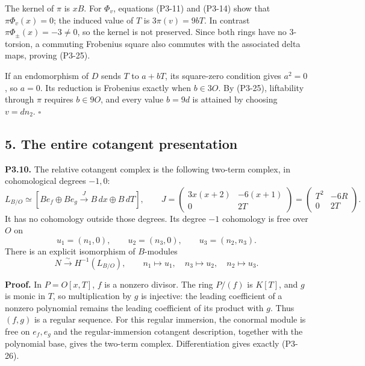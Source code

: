 \documentclass[
]{article}
\begin{document}
The kernel of \(\pi\) is \(xB\). For \(\Phi_v\), equations (P3-11) and
(P3-14) show that \(\pi\Phi_v(x)=0\); the induced value of \(T\) is
\(3\pi(v)=9bT\). In contrast \(\pi\Phi_\pm(x)=-3\ne0\), so the kernel is
not preserved. Since both rings have no 3-torsion, a commuting Frobenius
square also commutes with the associated delta maps, proving (P3-25).

If an endomorphism of \(D\) sends \(T\) to \(a+bT\), its square-zero
condition gives \(a^2=0\), so \(a=0\). Its reduction is Frobenius
exactly when \(b\in3O\). By (P3-25), liftability through \(\pi\)
requires \(b\in9O\), and every value \(b=9d\) is attained by choosing
\(v=dn_2\). \(\square\)

\subsection{5. The entire cotangent
presentation}\label{the-entire-cotangent-presentation}

\textbf{P3.10.} The relative cotangent complex is the following two-term
complex, in cohomological degrees \(-1,0\): \[
L_{B/O}\simeq
\left[B e_f\oplus B e_g
\xrightarrow{J}B\,dx\oplus B\,dT\right],
\qquad
J=\begin{pmatrix}
3x(x+2)&-6(x+1)\\0&2T
\end{pmatrix}
=\begin{pmatrix}T^2&-6R\\0&2T\end{pmatrix}.
\tag{P3-26}
\] It has no cohomology outside those degrees. Its degree \(-1\)
cohomology is free over \(O\) on \[
u_1=(n_1,0),\qquad u_2=(n_3,0),\qquad
u_3=(n_2,n_3).
\tag{P3-27}
\] There is an explicit isomorphism of \(B\)-modules \[
N\xrightarrow{\sim}H^{-1}(L_{B/O}),
\qquad n_1\mapsto u_1,\quad n_3\mapsto u_2,\quad n_2\mapsto u_3.
\tag{P3-28}
\]

\textbf{Proof.} In \(P=O[x,T]\), \(f\) is a nonzero divisor. The ring
\(P/(f)\) is \(K[T]\), and \(g\) is monic in \(T\), so multiplication by
\(g\) is injective: the leading coefficient of a nonzero polynomial
remains the leading coefficient of its product with \(g\). Thus
\((f,g)\) is a regular sequence. For this regular immersion, the
conormal module is free on \(e_f,e_g\) and the regular-immersion
cotangent description, together with the polynomial base, gives the
two-term complex. Differentiation gives exactly (P3-26).
\end{document}
